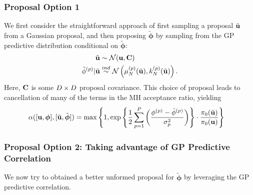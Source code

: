 \documentclass[12pt]{article}
\newcommand{\bphi}{\boldsymbol{\phi}}
\begin{document}
\subsubsection{Proposal Option 1}
We first consider the straightforward approach of first sampling a proposal $\tilde{\mathbf{u}}$ from a Gaussian proposal, and then proposing $\tilde{\bphi}$ by sampling from the 
GP predictive distribution conditional on $\tilde{\bphi}$: 
\begin{align*}
\tilde{\mathbf{u}} &\sim \mathcal{N}(\mathbf{u}, \mathbf{C}) \\
{\tilde{\phi}}^{(p)}|\tilde{\mathbf{u}} &\overset{ind}{\sim} \mathcal{N}\left(\mu_{N}^{(p)}(\tilde{\mathbf{u}}), k_{N}^{(p)}(\tilde{\mathbf{u}})\right).
\end{align*}
Here, $\mathbf{C}$ is some $D \times D$ proposal covariance. This choice of proposal leads to cancellation of many of the terms in the MH acceptance ratio, yielding
\begin{align*}
\accProbMH([\bpar, \bphi], [\tilde{\bpar}, \tilde{\bphi}]) 
&= \max\left\{1, \exp\left\{\frac{1}{2} \sum_{\objIdx=1}^{\Nobj} \left(\frac{ \indexObj{\phi} - \indexObj{\tilde{\phi}}}{\sdObs^2_{\objIdx}}\right)\right\} \cdot \frac{\priorDens(\tilde{\bpar})}{\priorDens(\bpar)} \right\}
\end{align*}

\subsubsection{Proposal Option 2: Taking advantage of GP Predictive Correlation}
We now try to obtained a better unformed proposal for $\tilde{\bphi}$ by leveraging the GP predictive correlation. 

\end{document}
